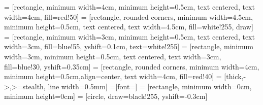 \documentclass[]{article}
\begin{document}

 = [rectangle, minimum width=4cm, minimum height=0.5cm, text centered, text width=4cm, fill=red!50]
 = [rectangle, rounded corners, minimum width=4.5cm, minimum height=0.5cm, text centered, text width=4.5cm, fill=white!255, draw]
 = [rectangle, minimum width=3cm, minimum height=0.5cm, text centered, text width=3cm, fill=blue!55, yshift=0.1cm, text=white!255]
 = [rectangle, minimum width=3cm, minimum height=0.5cm, text centered, text width=3cm, fill=blue!30, yshift=0.35cm]
 = [rectangle, rounded corners, minimum width=4cm, minimum height=0.5cm,align=center, text width=4cm, fill=red!40]
 = [thick,->,>=stealth, line width=0.5mm]
=[font=\scriptsize]
 = [rectangle, minimum width=0cm, minimum height=0cm]
 = [circle, draw=black!255, yshift=-0.3cm]
\end{document}
